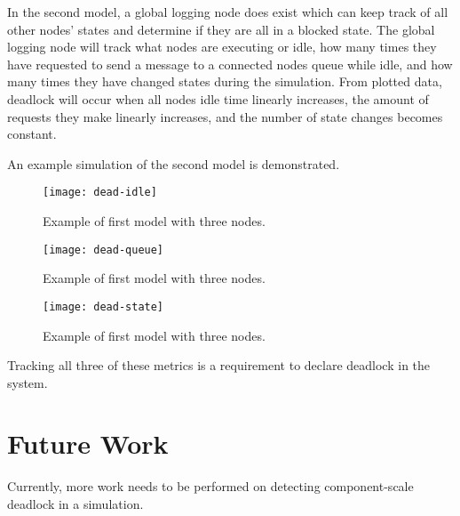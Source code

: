 \documentclass{article}
\begin{document}
In the second model, a global logging node does exist which can keep track of all other nodes' states and determine if they are all in a blocked state. The global logging node will track what nodes are executing or idle, how many times they have requested to send a message to a connected nodes queue while idle, and how many times they have changed states during the simulation. From plotted data, deadlock will occur when all nodes idle time linearly increases, the amount of requests they make linearly increases, and the number of state changes becomes constant. 

An example simulation of the second model is demonstrated.

\begin{figure}[H]
	\texttt{[image: dead-idle]}\newline
	\centering
	\caption{Example of first model with three nodes.}
	\centering
\end{figure}

\begin{figure}[H]
	\texttt{[image: dead-queue]}\newline
	\centering
	\caption{Example of first model with three nodes.}
	\centering
\end{figure}

\begin{figure}[H]
	\texttt{[image: dead-state]}\newline
	\centering
	\caption{Example of first model with three nodes.}
	\centering
\end{figure}

Tracking all three of these metrics is a requirement to declare deadlock in the system. 




\section{Future Work}
Currently, more work needs to be performed on detecting component-scale deadlock in a simulation.



\end{document}
